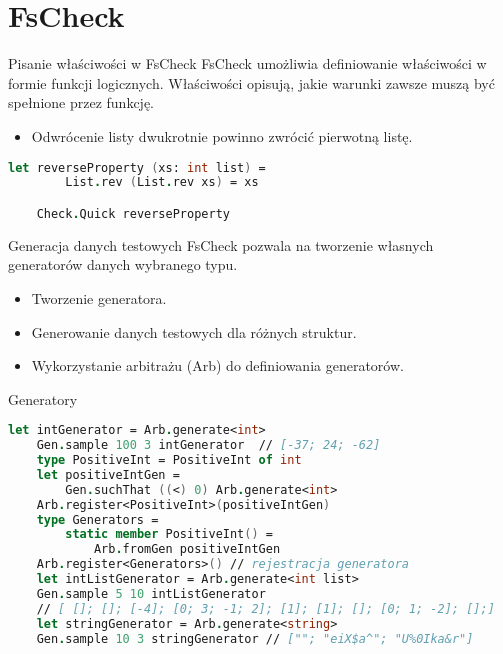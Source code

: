     \section{FsCheck}
    
    \begin{frame}[fragile]{Pisanie właściwości w FsCheck}
    FsCheck umożliwia definiowanie właściwości w formie funkcji logicznych. Właściwości opisują, jakie warunki zawsze muszą być spełnione przez funkcję.
    \begin{itemize}
        \item Odwrócenie listy dwukrotnie powinno zwrócić pierwotną listę.
    \end{itemize}
    \begin{lstlisting}[language=FSharp, xleftmargin=-10pt,xrightmargin=-10pt,numbers=none]
    let reverseProperty (xs: int list) =
        List.rev (List.rev xs) = xs

    Check.Quick reverseProperty
    \end{lstlisting}
    \end{frame}
    
    \begin{frame}{Generacja danych testowych}
    FsCheck pozwala na tworzenie własnych generatorów danych wybranego typu.
    \begin{itemize}
        \item Tworzenie generatora.
        \item Generowanie danych testowych dla różnych struktur.
        \item Wykorzystanie arbitrażu (Arb) do definiowania generatorów.
    \end{itemize}
    \end{frame}
    
    \begin{frame}[fragile]{Generatory}
    \begin{lstlisting}[language=FSharp, xleftmargin=-10pt,xrightmargin=-10pt,numbers=none,basicstyle=\ttfamily\small]
    let intGenerator = Arb.generate<int>
    Gen.sample 100 3 intGenerator  // [-37; 24; -62]
    type PositiveInt = PositiveInt of int  
    let positiveIntGen =
        Gen.suchThat ((<) 0) Arb.generate<int>
    Arb.register<PositiveInt>(positiveIntGen)     
    type Generators =
        static member PositiveInt() =
            Arb.fromGen positiveIntGen
    Arb.register<Generators>() // rejestracja generatora
    let intListGenerator = Arb.generate<int list>
    Gen.sample 5 10 intListGenerator 
    // [ []; []; [-4]; [0; 3; -1; 2]; [1]; [1]; []; [0; 1; -2]; [];]  
    let stringGenerator = Arb.generate<string>
    Gen.sample 10 3 stringGenerator // [""; "eiX$a^"; "U%0Ika&r"]     
    \end{lstlisting}
    \end{frame}
    
